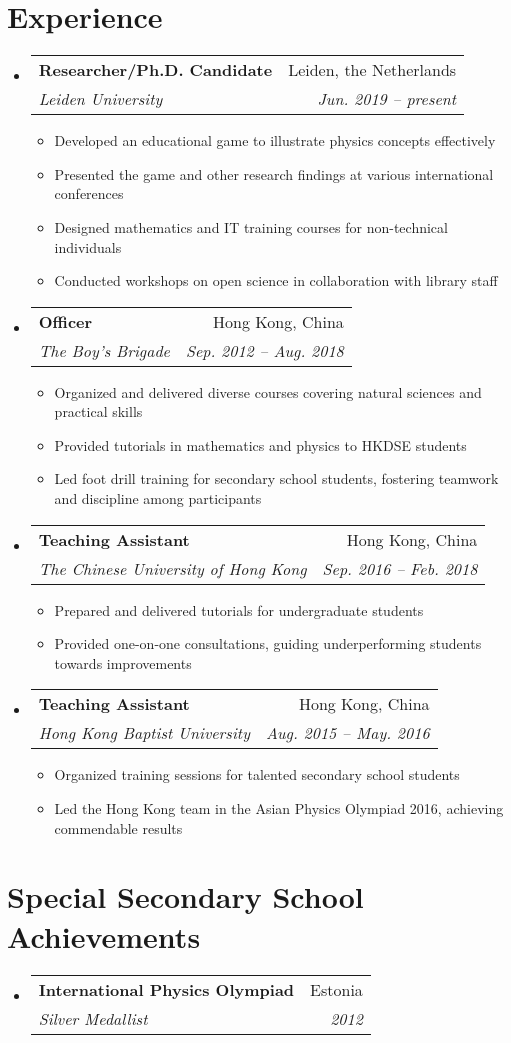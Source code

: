 \documentclass[letterpaper,11pt]{article}
\makeatletter
\newcommand{\resumeItem}[1]{
  \item\small{
    {#1 \vspace{-2pt}}
  }
}
\newcommand{\resumeSubheading}[4]{
  \vspace{-2pt}\item
    \begin{tabular*}{0.97\textwidth}[t]{l@{\extracolsep{\fill}}r}
      \textbf{#1} & #2 \\
      \textit{\small#3} & \textit{\small #4} \\
    \end{tabular*}\vspace{-7pt}
}
\newcommand{\resumeSubHeadingListStart}{\begin{itemize}[leftmargin=0.15in, label={}]}
\newcommand{\resumeSubHeadingListEnd}{\end{itemize}}
\newcommand{\resumeItemListStart}{\begin{itemize}}
\newcommand{\resumeItemListEnd}{\end{itemize}\vspace{-5pt}}
\makeatother
\begin{document}
\section{Experience}
  \resumeSubHeadingListStart

    \resumeSubheading
      {Researcher/Ph.D. Candidate}{Leiden, the Netherlands}
      {Leiden University}{Jun. 2019 -- present}
      \resumeItemListStart
        \resumeItem{Developed an educational game to illustrate physics concepts effectively}
        \resumeItem{Presented the game and other research findings at various international conferences}
        \resumeItem{Designed mathematics and IT training courses for non-technical individuals}
        \resumeItem{Conducted workshops on open science in collaboration with library staff}
      \resumeItemListEnd
      
    \resumeSubheading
      {Officer}{Hong Kong, China}
      {The Boy's Brigade}{Sep. 2012 -- Aug. 2018}
      \resumeItemListStart
        \resumeItem{Organized and delivered diverse courses covering natural sciences and practical skills}
        \resumeItem{Provided tutorials in mathematics and physics to HKDSE students}
        \resumeItem{Led foot drill training for secondary school students, fostering teamwork and discipline among participants}
      \resumeItemListEnd

    \resumeSubheading
      {Teaching Assistant}{Hong Kong, China}
      {The Chinese University of Hong Kong}{Sep. 2016 -- Feb. 2018}
      \resumeItemListStart
        \resumeItem{Prepared and delivered tutorials for undergraduate students}
        \resumeItem{Provided one-on-one consultations, guiding underperforming students towards improvements}
      \resumeItemListEnd

    \resumeSubheading
      {Teaching Assistant}{Hong Kong, China}
      {Hong Kong Baptist University}{Aug. 2015 -- May. 2016}
      \resumeItemListStart
        \resumeItem{Organized training sessions for talented secondary school students}
        \resumeItem{Led the Hong Kong team in the Asian Physics Olympiad 2016, achieving commendable results}
      \resumeItemListEnd

  \resumeSubHeadingListEnd


\section{Special Secondary School Achievements}
  \resumeSubHeadingListStart
    \resumeSubheading
      {International Physics Olympiad}{Estonia}
      {Silver Medallist}{2012}
  \resumeSubHeadingListEnd
\end{document}
